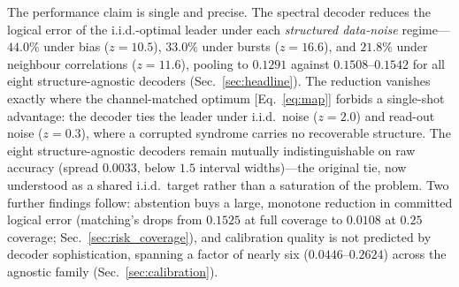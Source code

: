 \documentclass[reprint,aps,prxquantum,amsmath,amssymb,floatfix,nofootinbib,longbibliography]{revtex4-2}
\theoremstyle{definition}
\theoremstyle{remark}
\theoremstyle{plain}
\newcommand{\sync}[1]{#1}
\begin{document}
The performance claim is single and precise. The spectral decoder reduces the logical error of the i.i.d.-optimal leader under each \emph{structured data-noise} regime---$\sync{44.0}\%$ under bias ($z=\sync{10.5}$), $\sync{33.0}\%$ under bursts ($z=\sync{16.6}$), and $\sync{21.8}\%$ under neighbour correlations ($z=\sync{11.6}$), pooling to $\sync{0.1291}$ against $\sync{0.1508}$--$\sync{0.1542}$ for all eight structure-agnostic decoders (Sec.~\ref{sec:headline}). The reduction vanishes exactly where the channel-matched optimum [Eq.~\eqref{eq:map}] forbids a single-shot advantage: the decoder ties the leader under i.i.d.\ noise ($z=\sync{2.0}$) and read-out noise ($z=\sync{0.3}$), where a corrupted syndrome carries no recoverable structure. The eight structure-agnostic decoders remain mutually indistinguishable on raw accuracy (spread $\sync{0.0033}$, below $1.5$ interval widths)---the original tie, now understood as a shared i.i.d.\ target rather than a saturation of the problem. Two further findings follow: abstention buys a large, monotone reduction in committed logical error (matching's drops from $\sync{0.1525}$ at full coverage to $\sync{0.0108}$ at $\sync{0.25}$ coverage; Sec.~\ref{sec:risk_coverage}), and calibration quality is not predicted by decoder sophistication, spanning a factor of nearly six ($\sync{0.0446}$--$\sync{0.2624}$) across the agnostic family (Sec.~\ref{sec:calibration}).
\end{document}
